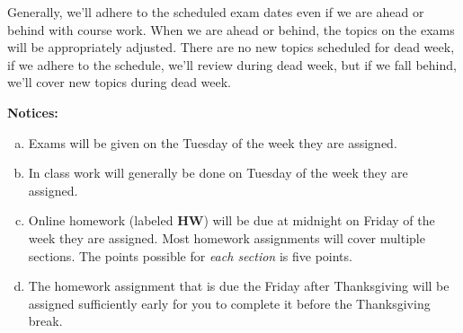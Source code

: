 \documentclass[12pt]{article}
\newcounter{ex}\setcounter{ex}{0}
\newenvironment{alphalist}{
  \begin{enumerate}[(a)]
    \addtolength{\itemsep}{-0.5\itemsep}}
  {\end{enumerate}}
\begin{document}
Generally, we'll adhere to the scheduled exam dates even if we 
are ahead or behind with course work.  
When we are ahead or behind, the
topics on the exams will be appropriately adjusted.  
There are no new topics scheduled for dead week, if we adhere to 
the schedule, we'll review during dead week, but
if we fall behind, we'll cover new topics during dead week.


\vspace{0.1in}
\noindent \textbf{Notices:}


\begin{alphalist}
   \item Exams will be given on the Tuesday of the week they are assigned.
   
   \item In class work  will generally be 
    done on Tuesday of the week they are assigned.

    \item Online homework (labeled \textbf{HW}) will be due at midnight on
          Friday of the week they are assigned. Most homework assignments will
          cover multiple sections. The points possible for \emph{each section} is
          five points.

    \item The homework assignment that is due the Friday after Thanksgiving
          will be assigned sufficiently early for you to complete it before
          the Thanksgiving break.
\end{alphalist}

\vspace{0.1in}
\end{document}
